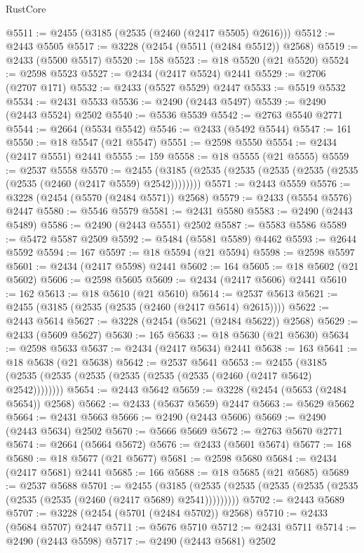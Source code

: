 \begin{lexlean}{RustCore}
\begin{coremodule}
@5511 := @2455 (@3185 (@2535 (@2460 (@2417 @5505) @2616)))
@5512 := @2443 @5505
@5517 := @3228 (@2454 (@5511 (@2484 @5512)) @2568)
@5519 := @2433 (@5500 @5517)
@5520 := 158
@5523 := @18 @5520 (@21 @5520)
@5524 := @2598 @5523
@5527 := @2434 (@2417 @5524) @2441
@5529 := @2706 (@2707 @171)
@5532 := @2433 (@5527 @5529) @2447
@5533 := @5519 @5532
@5534 := @2431 @5533
@5536 := @2490 (@2443 @5497)
@5539 := @2490 (@2443 @5524) @2502
@5540 := @5536 @5539
@5542 := @2763 @5540 @2771
@5544 := @2664 (@5534 @5542)
@5546 := @2433 (@5492 @5544)
@5547 := 161
@5550 := @18 @5547 (@21 @5547)
@5551 := @2598 @5550
@5554 := @2434 (@2417 @5551) @2441
@5555 := 159
@5558 := @18 @5555 (@21 @5555)
@5559 := @2537 @5558
@5570 := @2455 (@3185 (@2535 (@2535 (@2535 (@2535 (@2535 (@2535 (@2460 (@2417 @5559) @2542))))))))
@5571 := @2443 @5559
@5576 := @3228 (@2454 (@5570 (@2484 @5571)) @2568)
@5579 := @2433 (@5554 @5576) @2447
@5580 := @5546 @5579
@5581 := @2431 @5580
@5583 := @2490 (@2443 @5489)
@5586 := @2490 (@2443 @5551) @2502
@5587 := @5583 @5586
@5589 := @5472 @5587 @2509
@5592 := @5484 (@5581 @5589) @4462
@5593 := @2644 @5592
@5594 := 167
@5597 := @18 @5594 (@21 @5594)
@5598 := @2598 @5597
@5601 := @2434 (@2417 @5598) @2441
@5602 := 164
@5605 := @18 @5602 (@21 @5602)
@5606 := @2598 @5605
@5609 := @2434 (@2417 @5606) @2441
@5610 := 162
@5613 := @18 @5610 (@21 @5610)
@5614 := @2537 @5613
@5621 := @2455 (@3185 (@2535 (@2535 (@2460 (@2417 @5614) @2615))))
@5622 := @2443 @5614
@5627 := @3228 (@2454 (@5621 (@2484 @5622)) @2568)
@5629 := @2433 (@5609 @5627)
@5630 := 165
@5633 := @18 @5630 (@21 @5630)
@5634 := @2598 @5633
@5637 := @2434 (@2417 @5634) @2441
@5638 := 163
@5641 := @18 @5638 (@21 @5638)
@5642 := @2537 @5641
@5653 := @2455 (@3185 (@2535 (@2535 (@2535 (@2535 (@2535 (@2535 (@2460 (@2417 @5642) @2542))))))))
@5654 := @2443 @5642
@5659 := @3228 (@2454 (@5653 (@2484 @5654)) @2568)
@5662 := @2433 (@5637 @5659) @2447
@5663 := @5629 @5662
@5664 := @2431 @5663
@5666 := @2490 (@2443 @5606)
@5669 := @2490 (@2443 @5634) @2502
@5670 := @5666 @5669
@5672 := @2763 @5670 @2771
@5674 := @2664 (@5664 @5672)
@5676 := @2433 (@5601 @5674)
@5677 := 168
@5680 := @18 @5677 (@21 @5677)
@5681 := @2598 @5680
@5684 := @2434 (@2417 @5681) @2441
@5685 := 166
@5688 := @18 @5685 (@21 @5685)
@5689 := @2537 @5688
@5701 := @2455
    (@3185 (@2535 (@2535 (@2535 (@2535 (@2535 (@2535 (@2535 (@2460 (@2417 @5689) @2541)))))))))
@5702 := @2443 @5689
@5707 := @3228 (@2454 (@5701 (@2484 @5702)) @2568)
@5710 := @2433 (@5684 @5707) @2447
@5711 := @5676 @5710
@5712 := @2431 @5711
@5714 := @2490 (@2443 @5598)
@5717 := @2490 (@2443 @5681) @2502

\end{coremodule}
\end{lexlean}
